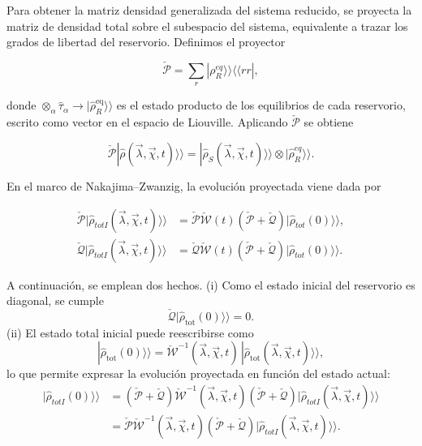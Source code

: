 \begin{appendixs}
Para obtener la matriz densidad generalizada del sistema reducido, se proyecta la matriz de densidad total sobre el subespacio del sistema, equivalente a trazar los grados de libertad del reservorio. Definimos el proyector

\begin{equation*}
\check{\mathcal{P}} = \sum_{r}|\rho_{R}^{eq} \rangle \rangle \langle \langle rr|,
\end{equation*}

donde \(\otimes_{\alpha} \hat{\tau}_{\alpha} \to |\hat{\rho}_{R}^{\mathrm{eq}} \rangle\rangle\) es el estado producto de los equilibrios de cada reservorio, escrito como vector en el espacio de Liouville. Aplicando \(\check{\mathcal{P}}\) se obtiene

\begin{equation*}
\check{\mathcal{P}}|\hat{\rho}(\vec{\lambda},\vec{\chi},t) \rangle \rangle = |\hat{\rho}_{S}(\vec{\lambda},\vec{\chi},t)\rangle \rangle \otimes |\hat{\rho}^{eq}_{R}\rangle \rangle .
\end{equation*}

En el marco de Nakajima–Zwanzig, la evolución proyectada viene dada por

\begin{align}
\check{\mathcal{P}}|\hat{\rho}_{totI}(\vec{\lambda},\vec{\chi},t)\rangle \rangle &=  \check{\mathcal{P}} \check{\mathcal{W}}(t)( \check{\mathcal{P}} +  \check{\mathcal{Q}})|\hat{\rho}_{tot}(0)\rangle \rangle , \label{apendix2proyectionev1}\\
\check{\mathcal{Q}}|\hat{\rho}_{totI}(\vec{\lambda},\vec{\chi},t)\rangle \rangle &= \check{\mathcal{Q}} \check{\mathcal{W}}(t)( \check{\mathcal{P}} +  \check{\mathcal{Q}})|\hat{\rho}_{tot}(0)\rangle \rangle .
\label{apendix2proyectionev}
\end{align}

A continuación, se emplean dos hechos. (i) Como el estado inicial del reservorio es diagonal, se cumple
\[
\check{\mathcal{Q}}|\hat{\rho}_{\mathrm{tot}}(0)\rangle\rangle = 0.
\]
(ii) El estado total inicial puede reescribirse como
\[
|\hat{\rho}_{\mathrm{tot}}(0)\rangle\rangle = \check{\mathcal{W}}^{-1}(\vec{\lambda}, \vec{\chi}, t)\, |\hat{\rho}_{\mathrm{tot}}(\vec{\lambda}, \vec{\chi}, t)\rangle\rangle,
\]
lo que permite expresar la evolución proyectada en función del estado actual:
\begin{align*}
|\hat{\rho}_{totI}(0)\rangle \rangle &= (\check{\mathcal{P}} + \check{\mathcal{Q}} )\check{\mathcal{W}}^{-1}(\vec{\lambda},\vec{\chi},t)(\check{\mathcal{P}} + \check{\mathcal{Q}})|\hat{\rho}_{totI}(\vec{\lambda},\vec{\chi},t)\rangle \rangle \\
&= \check{\mathcal{P}}\check{\mathcal{W}}^{-1}(\vec{\lambda},\vec{\chi},t)(\check{\mathcal{P}} + \check{\mathcal{Q}})|\hat{\rho}_{totI}(\vec{\lambda},\vec{\chi},t)\rangle \rangle .
\end{align*}


\end{appendixs}
